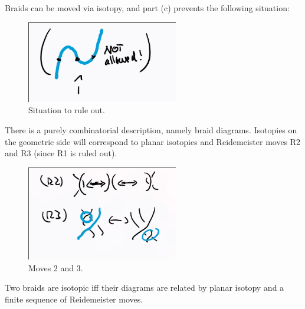\begin{remark}

Braids can be moved via isotopy, and part (c) prevents the following
situation:

\begin{figure}
\centering
\includegraphics[width=2.60417in,height=\textheight]{figures/image_2020-07-08-11-38-02.png}
\caption{Situation to rule out.}
\end{figure}

\end{remark}

There is a purely combinatorial description, namely braid diagrams.
Isotopies on the geometric side will correspond to planar isotopies and
Reidemeister moves R2 and R3 (since R1 is ruled out).

\begin{figure}
\centering
\includegraphics[width=2.60417in,height=\textheight]{figures/image_2020-07-08-11-42-13.png}
\caption{Moves 2 and 3.}
\end{figure}

\begin{theorem}[?]

Two braids are isotopic iff their diagrams are related by planar isotopy
and a finite sequence of Reidemeister moves.

\end{theorem}

